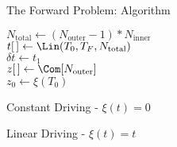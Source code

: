 \documentclass{beamer}
\begin{document}
\begin{frame}{The Forward Problem: Algorithm}
\begin{algorithm}[H]
    \footnotesize


        $ N_{\text{total}} \leftarrow (N_{\text{outer}} - 1)*N_{\text{inner}}$ \\
        $ t[\thinspace] \leftarrow \Lin(T_0,T_F,N_{\text{total}})$ \\
        $ \delta t \leftarrow t_1$ \\

        $ z[\thinspace] \leftarrow \Com[N_{\text{outer}}] $ \\
        $ z_0 \leftarrow \xi(T_0) $ \\

\nl{}
\end{algorithm}
\end{frame}

\begin{frame}{Constant Driving - $\xi(t) = 0$}
\begin{adjustbox}{max totalsize={\textwidth}{\textheight}}

\end{adjustbox}
\end{frame}

\begin{frame}{Linear Driving - $\xi(t) = t$}
    \begin{tabular}{cc}
\begin{adjustbox}{max totalsize={.3\textwidth}{.9\textheight}}

\end{adjustbox}
\begin{adjustbox}{max totalsize={.7\textwidth}{.9\textheight}}

\end{adjustbox}
\end{tabular}
\end{frame}
\end{document}
